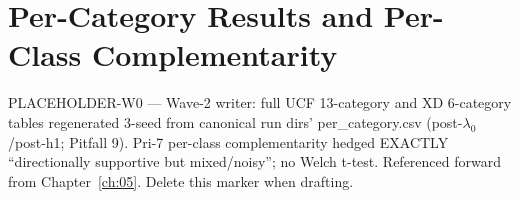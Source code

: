 \chapter{Per-Category Results and Per-Class Complementarity}
\label{app:b}

PLACEHOLDER-W0 --- Wave-2 writer: full UCF 13-category and XD 6-category
tables regenerated 3-seed from canonical run dirs' per\_category.csv
(post-$\lambda_0$/post-h1; Pitfall 9). Pri-7 per-class complementarity hedged
EXACTLY ``directionally supportive but mixed/noisy''; no Welch t-test.
Referenced forward from Chapter~\ref{ch:05}. Delete this marker when drafting.
